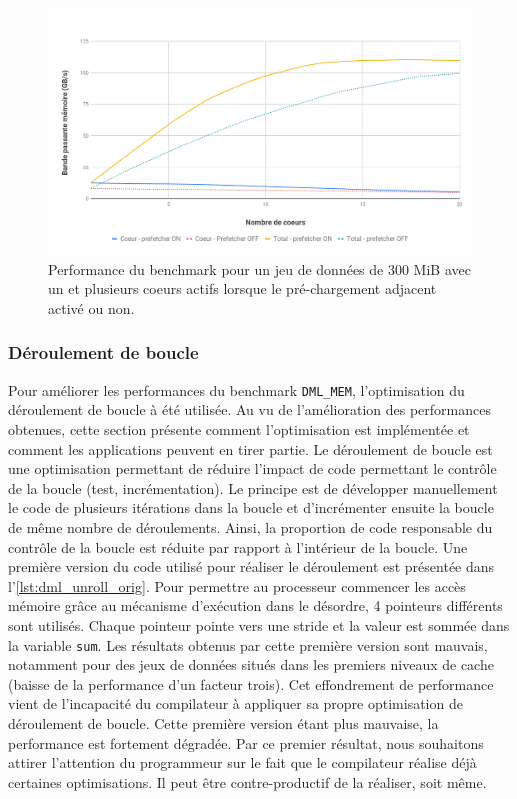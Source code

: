         
        \begin{figure}
        \center
        \includegraphics[width=14cm]{images/dml_prefetch_mpi.png}
        \caption{\label{pic:dml_prefetch_mpi} Performance du benchmark pour un jeu de données de 300 MiB avec un et plusieurs coeurs actifs lorsque le pré-chargement adjacent activé ou non.}
        \end{figure}
        
        
        
    
    \subsubsection{Déroulement de boucle} \label{sec:dml_unroll}
    Pour améliorer les performances du benchmark \verb=DML_MEM=, l'optimisation du déroulement de boucle à été utilisée. Au vu de l'amélioration des performances obtenues, cette section présente comment l'optimisation est implémentée et comment les applications peuvent en tirer partie. 
    Le déroulement de boucle est une optimisation permettant de réduire l'impact de code permettant le contrôle de la boucle (test, incrémentation). Le principe est de développer manuellement le code de plusieurs itérations dans la boucle et d'incrémenter ensuite la boucle de même nombre de déroulements. Ainsi, la proportion de code responsable du contrôle de la boucle est réduite par rapport à l'intérieur de la boucle. Une première version du code utilisé pour réaliser le déroulement est présentée dans l'\autoref{lst:dml_unroll_orig}. Pour permettre au processeur commencer les accès mémoire grâce au mécanisme d'exécution dans le désordre, 4 pointeurs différents sont utilisés. Chaque pointeur pointe vers une stride et la valeur est sommée dans la variable \verb|sum|. Les résultats obtenus par cette première version sont mauvais, notamment pour des jeux de données situés dans les premiers niveaux de cache (baisse de la performance d'un facteur trois). Cet effondrement de performance vient de l'incapacité du compilateur à appliquer sa propre optimisation de déroulement de boucle. Cette première version étant plus mauvaise, la performance est fortement dégradée. Par ce premier résultat, nous souhaitons attirer l'attention du programmeur sur le fait que le compilateur réalise déjà certaines optimisations. Il peut être contre-productif de la réaliser, soit même. 
    
